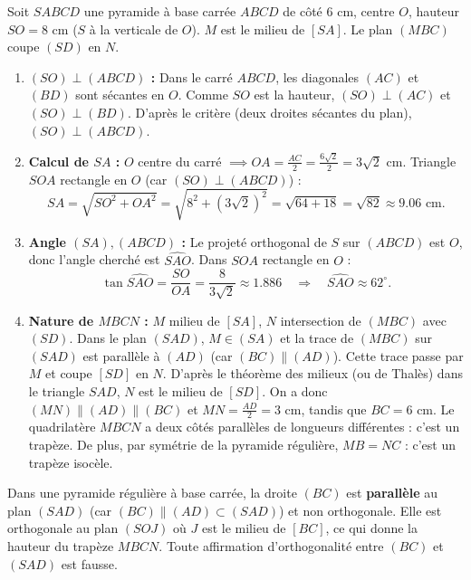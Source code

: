 \documentclass[11pt]{article}
\newcommand{\cle}[1]{{\popxbold\color{popdark}#1}}
\begin{document}
\begin{corrige}
Soit $SABCD$ une pyramide à base carrée $ABCD$ de côté $6$ cm, centre $O$, hauteur $SO = 8$ cm ($S$ à la verticale de $O$). $M$ est le milieu de $[SA]$. Le plan $(MBC)$ coupe $(SD)$ en $N$.
\begin{enumerate}
\item \textbf{$(SO) \perp (ABCD)$ :} Dans le carré $ABCD$, les diagonales $(AC)$ et $(BD)$ sont sécantes en $O$. Comme $SO$ est la hauteur, $(SO) \perp (AC)$ et $(SO) \perp (BD)$. D'après le critère (deux droites sécantes du plan), $(SO) \perp (ABCD)$.
\item \textbf{Calcul de $SA$ :} $O$ centre du carré $\implies OA = \frac{AC}{2} = \frac{6\sqrt{2}}{2} = 3\sqrt{2}$ cm. Triangle $SOA$ rectangle en $O$ (car $(SO)\perp(ABCD)$) :
\[ SA = \sqrt{SO^2 + OA^2} = \sqrt{8^2 + (3\sqrt{2})^2} = \sqrt{64 + 18} = \sqrt{82} \approx \num{9,06} \text{ cm}. \]
\item \textbf{Angle $(SA), (ABCD)$ :} Le projeté orthogonal de $S$ sur $(ABCD)$ est $O$, donc l'angle cherché est $\widehat{SAO}$. Dans $SOA$ rectangle en $O$ :
\[ \tan\widehat{SAO} = \frac{SO}{OA} = \frac{8}{3\sqrt{2}} \approx \num{1,886} \quad\Rightarrow\quad \widehat{SAO} \approx 62^\circ. \]
\item \textbf{Nature de $MBCN$ :} $M$ milieu de $[SA]$, $N$ intersection de $(MBC)$ avec $(SD)$. Dans le plan $(SAD)$, $M \in (SA)$ et la trace de $(MBC)$ sur $(SAD)$ est parallèle à $(AD)$ (car $(BC)\parallel(AD)$). Cette trace passe par $M$ et coupe $[SD]$ en $N$. D'après le théorème des milieux (ou de Thalès) dans le triangle $SAD$, $N$ est le milieu de $[SD]$. On a donc $(MN) \parallel (AD) \parallel (BC)$ et $MN = \frac{AD}{2} = 3$ cm, tandis que $BC = 6$ cm. Le quadrilatère $MBCN$ a deux côtés parallèles de longueurs différentes : c'est un \cle{trapèze}. De plus, par symétrie de la pyramide régulière, $MB = NC$ : c'est un \cle{trapèze isocèle}.
\end{enumerate}
\end{corrige}

\begin{attention}
Dans une pyramide régulière à base carrée, la droite $(BC)$ est \textbf{parallèle} au plan $(SAD)$ (car $(BC)\parallel(AD)\subset(SAD)$) et non orthogonale. Elle est orthogonale au plan $(SOJ)$ où $J$ est le milieu de $[BC]$, ce qui donne la hauteur du trapèze $MBCN$. Toute affirmation d'orthogonalité entre $(BC)$ et $(SAD)$ est fausse.
\end{attention}
\end{document}
